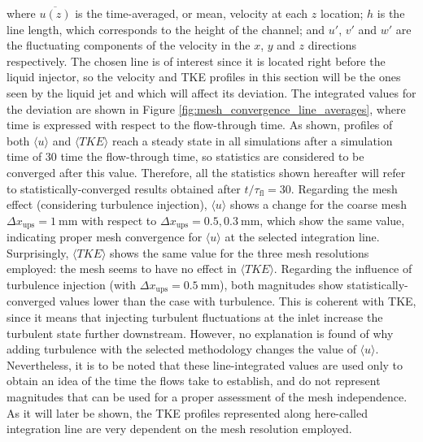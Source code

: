 where $\overline{u \left( z \right)}$ is the time-averaged, or mean, velocity at each $z$ location; $h$ is the line length, which corresponds to the height of the channel; and $u'$, $v'$ and $w'$ are the fluctuating components of the velocity in the $x$, $y$ and $z$ directions respectively. The chosen line is of interest since it is located right before the liquid injector, so the velocity and TKE profiles in this section will be the ones seen by the liquid jet and which will affect its deviation. The integrated values for the deviation are shown in Figure \ref{fig:mesh_convergence_line_averages}, where time is expressed with respect to the flow-through time. As shown, profiles of both $\langle u \rangle$ and $\langle TKE \rangle$ reach a steady state in all simulations after a simulation time of $30$ time the flow-through time, so statistics are considered to be converged after this value. Therefore, all the statistics shown hereafter will refer to statistically-converged results obtained after $t / \tau_\mathrm{fl} = 30$. Regarding the mesh effect (considering turbulence injection), $\langle u \rangle$ shows a change for the coarse mesh $\Delta x_\mathrm{ups} = 1~\mathrm{mm}$ with respect to $\Delta x_\mathrm{ups} = 0.5, 0.3~\mathrm{mm}$, which show the same value, indicating proper mesh convergence for $\langle u \rangle$ at the selected integration line. Surprisingly, $\langle TKE \rangle$ shows the same value for the three mesh resolutions employed: the mesh seems to have no effect in $\langle TKE \rangle$. Regarding the influence of turbulence injection (with $\Delta x_\mathrm{ups} = 0.5~\mathrm{mm}$), both magnitudes show statistically-converged values lower than the case with turbulence. This is coherent with TKE, since it means that injecting turbulent fluctuations at the inlet increase the turbulent state further downstream. However, no explanation is found of why adding turbulence with the selected methodology changes the value of $\langle u \rangle$. Nevertheless, it is to be noted that these line-integrated values are used only to obtain an idea of the time the flows take to establish, and do not represent magnitudes that can be used for a proper assessment of the mesh independence. As it will later be shown, the TKE profiles represented along here-called integration line are very dependent on the mesh resolution employed.


